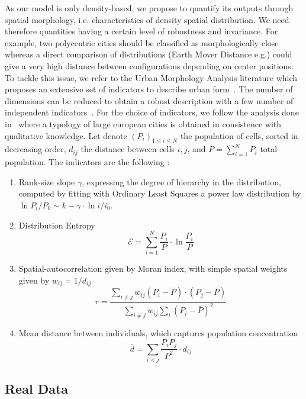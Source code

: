 \documentclass[10pt,letterpaper,draft]{article}
\begin{document}
As our model is only density-based, we propose to quantify its outputs through spatial morphology, i.e. characteristics of density spatial distribution. We need therefore quantities having a certain level of robustness and invariance. For example, two polycentric cities should be classified as morphologically close whereas a direct comparison of distributions (Earth Mover Distance e.g.) could give a very high distance between configurations depending on center positions. To tackle this issue, we refer to the Urban Morphology Analysis literature which proposes an extensive set of indicators to describe urban form~\cite{tsai2005quantifying}. The number of dimensions can be reduced to obtain a robust description with a few number of independent indicators~\cite{Schwarz201029}. For the choice of indicators, we follow the analysis done in~\cite{le2015forme} where a typology of large european cities is obtained in consistence with qualitative knowledge. Let denote $(P_i)_{1\leq i \leq N}$ the population of cells, sorted in decreasing order, $d_{ij}$ the distance between cells $i,j$, and $P=\sum_{i=1}^{N} P_i$ total population. The indicators are the following :

\begin{enumerate}
\item Rank-size slope $\gamma$, expressing the degree of hierarchy in the distribution, computed by fitting with Ordinary Least Squares a power law distribution by $\ln{P_i/P_0} \sim k - \gamma\cdot \ln{i/i_0}$.
\item Distribution Entropy
\begin{equation}
\mathcal{E} = \sum_{i=1}^{N}\frac{P_i}{P}\cdot \ln{\frac{P_i}{P}}
\end{equation}
\item Spatial-autocorrelation given by Moran index, with simple spatial weights given by $w_{ij} = 1/d_{ij}$
\[
r = \frac{\sum_{i\neq j} w_{ij} \left(P_i - \bar{P}\right)\cdot\left(P_j - \bar{P}\right)}{\sum_{i\neq j} w_{ij} \sum_{i}{\left( P_i - \bar{P}\right)}^2}
\]
\item Mean distance between individuals, which captures population concentration
\[
\bar{d} = \sum_{i<j} \frac{P_i P_j}{P^2} \cdot d_{ij}
\]
\end{enumerate}






\subsection*{Real Data}
\end{document}
